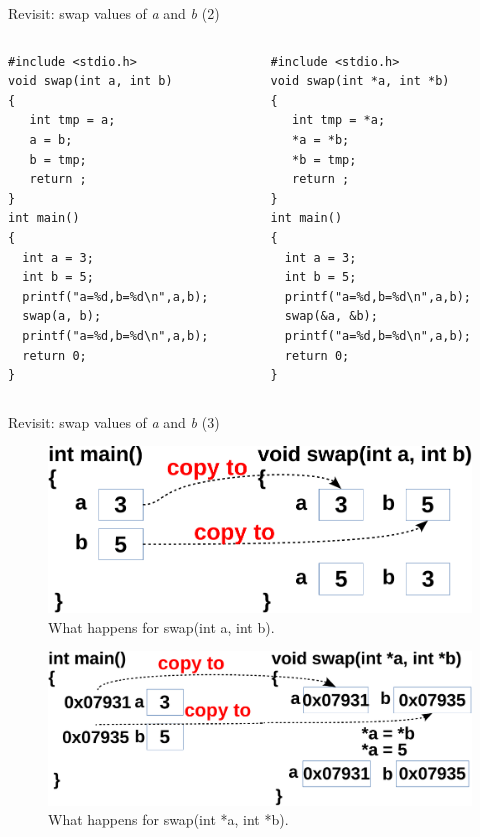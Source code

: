 \begin{frame}[fragile]{Revisit: swap values of \textit{a} and \textit{b} (2)}
\vspace{-0.25in}
\begin{columns}
\begin{column}{0.47\linewidth}
\begin{lstlisting}
#include <stdio.h>
void swap(int a, int b)
{
   int tmp = a;
   a = b;
   b = tmp;
   return ;
}
int main()
{
  int a = 3; 
  int b = 5;
  printf("a=%d,b=%d\n",a,b);
  swap(a, b);
  printf("a=%d,b=%d\n",a,b);
  return 0;
}
\end{lstlisting}
\end{column}
\begin{column}{0.47\linewidth}
\begin{lstlisting}[xleftmargin=0.005\linewidth]
#include <stdio.h>
void swap(int *a, int *b)
{
   int tmp = *a;
   *a = *b;
   *b = tmp;
   return ;
}
int main()
{
  int a = 3; 
  int b = 5;
  printf("a=%d,b=%d\n",a,b);
  swap(&a, &b);
  printf("a=%d,b=%d\n",a,b);
  return 0;
}
\end{lstlisting}
\end{column}
\end{columns}
\end{frame}

\begin{frame}[fragile]{Revisit: swap values of \textit{a} and \textit{b} (3)}
\begin{figure}
	\includegraphics[width=0.55\linewidth]{figs/swap1.pdf}
	\caption{What happens for swap(int a, int b).}
\end{figure}

\begin{figure}
	\includegraphics[width=0.62\linewidth]{figs/swap2.pdf}
	\caption{What happens for swap(int *a, int *b).}
\end{figure}
\end{frame}


